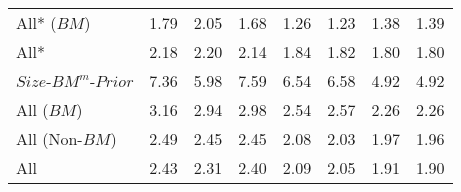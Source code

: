 \begin{table}[!ht]
\begin{tabular}{lrrrrrrr}
    All* ($BM$)             & 1.79  & 2.05  & 1.68  & 1.26  & 1.23  & 1.38  & 1.39  \\
    All*                    & 2.18  & 2.20  & 2.14  & 1.84  & 1.82  & 1.80  & 1.80  \\
  [1em]

    $Size$-$BM^m$-$Prior$   & 7.36  & 5.98  & 7.59  & 6.54  & 6.58  & 4.92  & 4.92  \\
  [1em]

    All ($BM$)              & 3.16  & 2.94  & 2.98  & 2.54  & 2.57  & 2.26  & 2.26  \\
    All (Non-$BM$)          & 2.49  & 2.45  & 2.45  & 2.08  & 2.03  & 1.97  & 1.96  \\
    All                     & 2.43  & 2.31  & 2.40  & 2.09  & 2.05  & 1.91  & 1.90  \\
  
  \bottomrule
\end{tabular}
\label{tbl:GRS}
\end{table}